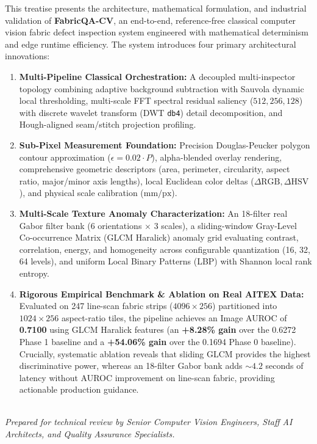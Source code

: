\documentclass[10pt,a4paper]{article}
\begin{document}
This treatise presents the architecture, mathematical formulation, and industrial validation of \textbf{FabricQA-CV}, an end-to-end, reference-free classical computer vision fabric defect inspection system engineered with mathematical determinism and edge runtime efficiency. The system introduces four primary architectural innovations:
\begin{enumerate}[leftmargin=1.5em,itemsep=2pt,topsep=2pt]
    \item \textbf{Multi-Pipeline Classical Orchestration:} A decoupled multi-inspector topology combining adaptive background subtraction with Sauvola dynamic local thresholding, multi-scale FFT spectral residual saliency ($512, 256, 128$) with discrete wavelet transform (DWT \texttt{db4}) detail decomposition, and Hough-aligned seam/stitch projection profiling.
    \item \textbf{Sub-Pixel Measurement Foundation:} Precision Douglas-Peucker polygon contour approximation ($\epsilon = 0.02 \cdot P$), alpha-blended overlay rendering, comprehensive geometric descriptors (area, perimeter, circularity, aspect ratio, major/minor axis lengths), local Euclidean color deltas ($\Delta\text{RGB}, \Delta\text{HSV}$), and physical scale calibration ($\text{mm}/\text{px}$).
    \item \textbf{Multi-Scale Texture Anomaly Characterization:} An 18-filter real Gabor filter bank (6 orientations $\times$ 3 scales), a sliding-window Gray-Level Co-occurrence Matrix (GLCM Haralick) anomaly grid evaluating contrast, correlation, energy, and homogeneity across configurable quantization (16, 32, 64 levels), and uniform Local Binary Patterns (LBP) with Shannon local rank entropy.
    \item \textbf{Rigorous Empirical Benchmark \& Ablation on Real AITEX Data:} Evaluated on 247 line-scan fabric strips ($4096 \times 256$) partitioned into $1024 \times 256$ aspect-ratio tiles, the pipeline achieves an Image AUROC of \textbf{0.7100} using GLCM Haralick features (an \textbf{+8.28\% gain} over the 0.6272 Phase 1 baseline and a \textbf{+54.06\% gain} over the 0.1694 Phase 0 baseline). Crucially, systematic ablation reveals that sliding GLCM provides the highest discriminative power, whereas an 18-filter Gabor bank adds $\sim 4.2$ seconds of latency without AUROC improvement on line-scan fabric, providing actionable production guidance.
\end{enumerate}

\vspace{1.5em}
\noindent\hrulefill\\
\small \textit{Prepared for technical review by Senior Computer Vision Engineers, Staff AI Architects, and Quality Assurance Specialists.}
\end{document}
